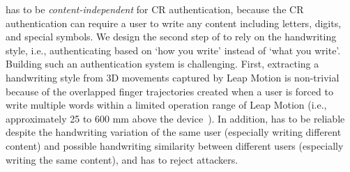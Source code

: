 \CiT has to be \textit{content-independent} for CR authentication, because the CR authentication can require a user to write any content including letters, digits, and special symbols.
We design the second step of \CiT to rely on the handwriting style, i.e., authenticating based on `how you write' instead of `what you write'.   Building such an authentication system is challenging. First, extracting a  handwriting style from 3D movements captured by Leap Motion 
is non-trivial because of the overlapped finger trajectories created when a user is forced to write multiple words within a limited operation range of Leap Motion (i.e., approximately 25 to 600 mm above the device~\cite{LeapOnlineOverview}). In addition,  \CiT has to be reliable despite the handwriting variation of the same user (especially writing different content) and possible handwriting similarity between different users (especially writing the same content), and \CiT has to reject attackers.


